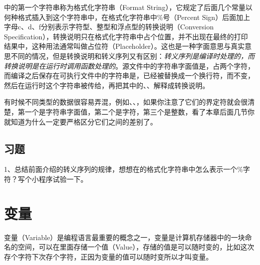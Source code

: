 中的第一个字符串称为格式化字符串（Format String），它规定了后面几个常量以何种格式插入到这个字符串中，在格式化字符串中\%号（Percent Sign）后面加上字母c、d、f分别表示字符型、整型和浮点型的转换说明（Conversion Specification），转换说明只在格式化字符串中占个位置，并不出现在最终的打印结果中，这种用法通常叫做占位符（Placeholder）。这也是一种字面意思与真实意思不同的情况，但是转换说明和转义序列又有区别：\emph{转义序列是编译时处理的，而转换说明是在运行时调用函数处理的}。源文件中的字符串字面值是，占两个字符，而编译之后保存在可执行文件中的字符串是，已经被替换成一个换行符，而不变，然后在运行时这个字符串被传给，再把其中的、、解释成转换说明。



有时候不同类型的数据很容易弄混，例如\BookCode{\BookQuoteChar{}5\BookQuoteChar{}}、、，如果你注意了它们的界定符就会很清楚，第一个是字符串字面值，第二个是字符，第三个是整数，看了本章后面几节你就知道为什么一定要严格区分它们之间的差别了。


\subsection*{习题}
%


1、总结前面介绍的转义序列的规律，想想在的格式化字符串中怎么表示一个\%字符？写个小程序试验一下。




\section{变量}
%
变量（Variable）是编程语言最重要的概念之一，变量是计算机存储器中的一块命名的空间，可以在里面存储一个值（Value），存储的值是可以随时变的，比如这次存个字符下次存个字符，正因为变量的值可以随时变所以才叫变量。



